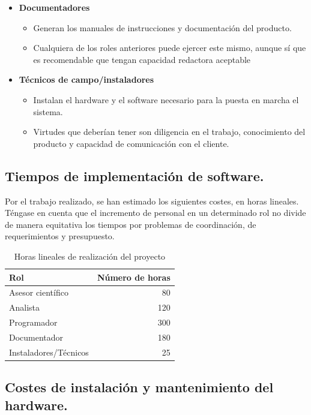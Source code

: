 \begin{itemize}
	\item{\textbf{Documentadores}
		\begin{itemize}
			\item{Generan los manuales de instrucciones y documentación del producto.}
			\item{Cualquiera de los roles anteriores puede ejercer este mismo, aunque sí que es recomendable que tengan capacidad redactora aceptable}
		\end{itemize}}

	\item{\textbf{Técnicos de campo/instaladores}
		\begin{itemize}
			\item{Instalan el hardware y el software necesario para la puesta en marcha el sistema.}
			\item{Virtudes que deberían tener son diligencia en el trabajo, conocimiento del producto y capacidad de comunicación con el cliente.}
		\end{itemize}}

\end{itemize}

\subsection{Tiempos de implementación de software.}
Por el trabajo realizado, se han estimado los siguientes costes, en horas lineales. Téngase en cuenta que el incremento de personal en un determinado rol no divide de manera equitativa los tiempos por problemas de coordinación, de requerimientos y presupuesto.

\begin{table}[!hbt]
	\centering
	\begin{tabular}{|l|r|}
		\hline
		\textbf{Rol} & \textbf{Número de horas} \\
		\hline \hline	
		Asesor científico & 80 \\ \hline
		Analista & 120 \\ \hline
		Programador & 300 \\ \hline 
		Documentador & 180 \\ \hline
		Instaladores/Técnicos & 25 \\ \hline
	\end{tabular}
	\caption{Horas lineales de realización del proyecto}
	\label{tab:project_hours}
\end{table}

\subsection{Costes de instalación y mantenimiento del hardware.}
